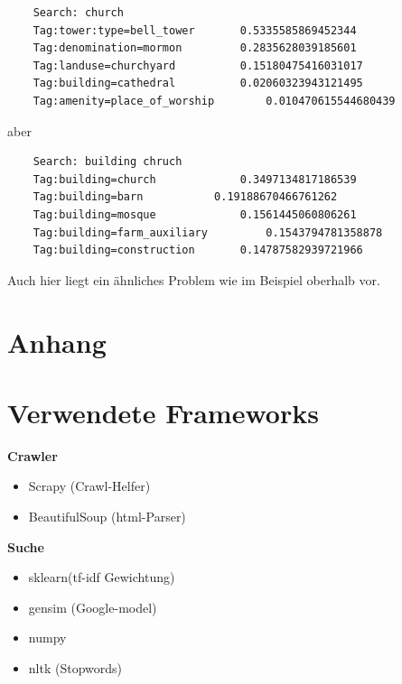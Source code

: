 \documentclass[12pt,pdftex,a4paper]{article}
\begin{document}
\begin{lstlisting}
	Search: church
	Tag:tower:type=bell_tower 	 	0.5335585869452344
	Tag:denomination=mormon 	 	0.2835628039185601
	Tag:landuse=churchyard 	 		0.15180475416031017
	Tag:building=cathedral 	 		0.02060323943121495
	Tag:amenity=place_of_worship		0.010470615544680439
\end{lstlisting}
aber
\begin{lstlisting}
	Search: building chruch
	Tag:building=church 	 		0.3497134817186539
	Tag:building=barn 	 		0.19188670466761262
	Tag:building=mosque 	 		0.1561445060806261
	Tag:building=farm_auxiliary 		0.1543794781358878
	Tag:building=construction 	 	0.14787582939721966
\end{lstlisting}
Auch hier liegt ein ähnliches Problem wie im Beispiel oberhalb vor.

\pagebreak
\section{Anhang}


\section*{Verwendete Frameworks}
\textbf{Crawler}
\begin{itemize}
	\item Scrapy (Crawl-Helfer) 
	\item BeautifulSoup (html-Parser)
\end{itemize}
\textbf{Suche}
\begin{itemize}
	\item sklearn(tf-idf Gewichtung)
	\item gensim (Google-model)
	\item numpy 
	\item nltk (Stopwords)
\end{itemize}





\end{document}
